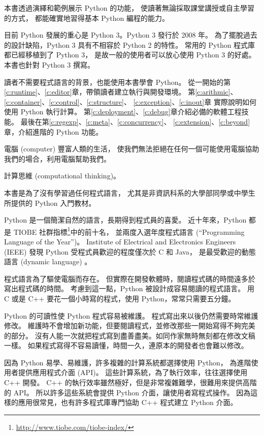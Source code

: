 \documentclass[a4paper,12pt]{book}
\theoremstyle{definition}
\begin{document}
本書透過演繹和範例展示 Python 的功能，
使讀著無論採取課堂講授或自主學習的方式，
都能確實地習得基本 Python 編程的能力。

目前 Python 發展的重心是 Python 3。Python 3 發行於 2008 年。
為了擺脫過去的設計缺陷，Python 3 具有不相容於 Python 2 的特性。
常用的 Python 程式庫都已經移植到了 Python 3，
是故一般的使用者可以放心使用 Python 3 的好處。
本書也針對 Python 3 撰寫。

%
%

讀者不需要程式語言的背景，也能使用本書學會 Python。
從一開始的第\ref{c:runtime}、\ref{c:editor}章，帶領讀者建立執行與開發環境。
第\ref{c:arithmic}、\ref{c:container}、\ref{c:control}、\ref{c:structure}、%
\ref{c:exception}、\ref{c:inout}章%
實際說明如何使用 Python 執行計算。
第\ref{c:deployment}、\ref{c:debug}章介紹必備的軟體工程技能。
最後在第\ref{c:regexp}、\ref{c:meta}、\ref{c:concurrency}、%
\ref{c:extension}、\ref{c:beyond}章，介紹進階的 Python 功能。

%
%

電腦 (computer) 豐富人類的生活，
使我們無法拒絕在任何一個可能使用電腦協助我們的場合，利用電腦幫助我們。

計算思維 (computational thinking)。

本書是為了沒有學習過任何程式語言，
尤其是非資訊科系的大學部同學或中學生所提供的 Python 入門教材。

Python 是一個簡潔自然的語言，長期得到程式員的喜愛。
近十年來，Python 都是
TIOBE 社群指標\footnote{\url{http://www.tiobe.com/tiobe-index/}}中的前十名，
並兩度入選年度程式語言 (``Programming Language of the Year'')。
Institute of Electrical and Electronics Engineers (IEEE) 發現
Python 受程式員歡迎的程度僅次於 C 和 Java，
是最受歡迎的動態語言 (dynamic language) \cite{cass_interactive:_2016}。

程式語言為了驅使電腦而存在。
但實際在開發軟體時，閱讀程式碼的時間遠多於寫出程式碼的時間。
考慮到這一點，Python 被設計成容易閱讀的程式語言。
用 C 或是 C++ 要花一個小時寫的程式，使用 Python，常常只需要五分鐘。

Python 的可讀性使 Python 程式容易被維護。
程式寫出來以後仍然需要時常維護修改。
維護時不會增加新功能，但要閱讀程式，並修改那些一開始寫得不夠完美的部分。
沒有人能一次就把程式寫到盡善盡美。如同作家無時無刻都在修改文稿一樣。
如果程式寫得不容易讀懂，時間一久，連原本的開發者也會難以修改。

因為 Python 易學、易維護，許多複雜的計算系統都選擇使用 Python，
為進階使用者提供應用程式介面 (API)。
這些計算系統，為了執行效率，往往選擇使用 C++ 開發。
C++ 的執行效率雖然極好，但是非常複雜難學，很難用來提供高階的 API。
所以許多這些系統會提供 Python 介面，讓使用者寫程式操作。
因為這樣的應用很常見，也有許多程式庫專門協助 C++ 程式建立 Python 介面。
\end{document}
